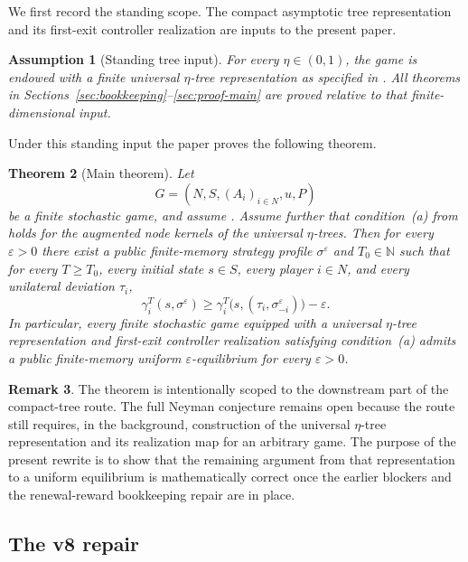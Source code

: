 \documentclass[12pt]{article}
\newtheorem{theorem}{Theorem}[section]
\newtheorem{assumption}[theorem]{Assumption}
\theoremstyle{definition}
\newtheorem{remark}[theorem]{Remark}
\newcommand{\eps}{\varepsilon}
\newcommand{\N}{\mathbb{N}}
\newcommand{\1}{\mathbf{1}}
\begin{document}
We first record the standing scope. The compact asymptotic tree representation and
its first-exit controller realization are inputs to the present paper.

\begin{assumption}[Standing tree input]
\label{ass:tree-input}
For every $\eta\in(0,1)$, the game is endowed with a finite universal
$\eta$-tree representation as specified in
. All theorems in
Sections~\ref{sec:bookkeeping}--\ref{sec:proof-main} are proved relative to that
finite-dimensional input.
\end{assumption}

Under this standing input the paper proves the following theorem.

\begin{theorem}[Main theorem]
\label{thm:main}
Let
\[
G=(N,S,(A_i)_{i\in N},u,P)
\]
be a finite stochastic game, and assume . Assume further
that condition~\textnormal{(a)} from  holds for the augmented node
kernels of the universal $\eta$-trees. Then for every $\eps>0$ there exist a
public finite-memory strategy profile $\sigma^\eps$ and $T_0\in\N$ such that for
every $T\ge T_0$, every initial state $s\in S$, every player $i\in N$, and every
unilateral deviation $\tau_i$,
\[
\gamma_i^T(s,\sigma^\eps)
\ge
\gamma_i^T\bigl(s,(\tau_i,\sigma^\eps_{-i})\bigr)-\eps.
\]
In particular, every finite stochastic game equipped with a universal
$\eta$-tree representation and first-exit controller realization satisfying
condition~\textnormal{(a)} admits a public finite-memory uniform
$\eps$-equilibrium for every $\eps>0$.
\end{theorem}

\begin{remark}
The theorem is intentionally scoped to the downstream part of the compact-tree
route. The full Neyman conjecture remains open because the route still requires,
in the background, construction of the universal $\eta$-tree representation and
its realization map for an arbitrary game. The purpose of the present rewrite is
to show that the remaining argument from that representation to a uniform
equilibrium is mathematically correct once the earlier blockers and the
renewal-reward bookkeeping repair are in place.
\end{remark}


\subsection{The v8 repair}
\end{document}
